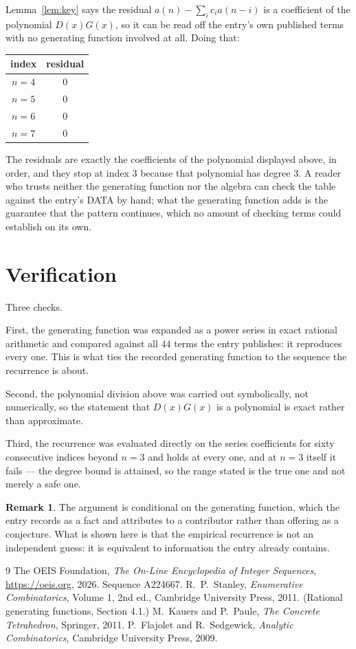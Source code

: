 \documentclass[11pt,a4paper]{article}
\theoremstyle{plain}
\theoremstyle{definition}
\newtheorem{remark}[theorem]{Remark}
\begin{document}
Lemma~\ref{lem:key} says the residual $a(n)-\sum_ic_ia(n-i)$ is a coefficient of the
polynomial $D(x)G(x)$, so it can be read off the entry's own published terms with no
generating function involved at all. Doing that:
\begin{center}
\begin{tabular}{cc}
index & residual \\ \hline
$n=4$ & $0$ \\
$n=5$ & $0$ \\
$n=6$ & $0$ \\
$n=7$ & $0$
\end{tabular}
\end{center}
The residuals are exactly the coefficients of the polynomial displayed above, in order, and
they stop at index $3$ because that polynomial has degree $3$. A reader who trusts
neither the generating function nor the algebra can check the table against the entry's DATA
by hand; what the generating function adds is the guarantee that the pattern continues, which
no amount of checking terms could establish on its own.

\section{Verification}

Three checks.

First, the generating function was expanded as a power series in exact rational arithmetic and
compared against all $44$ terms the entry publishes: it reproduces every one. This is
what ties the recorded generating function to the sequence the recurrence is about.

Second, the polynomial division above was carried out symbolically, not numerically, so the
statement that $D(x)G(x)$ is a polynomial is exact rather than approximate.

Third, the recurrence was evaluated directly on the series coefficients for sixty consecutive
indices beyond $n=3$ and holds at every one, and at $n=3$ itself it fails --- the
degree bound is attained, so the range stated is the true one and not merely a safe one.

\begin{remark}
The argument is conditional on the generating function, which the entry records as a fact and
attributes to a contributor rather than offering as a conjecture. What is shown here is that
the empirical recurrence is not an independent guess: it is equivalent to information the
entry already contains.
\end{remark}

\begin{thebibliography}{9}
 The OEIS Foundation, \emph{The On-Line Encyclopedia of Integer
Sequences}, \url{https://oeis.org}, 2026. Sequence A224667.
 R.~P.~Stanley, \emph{Enumerative Combinatorics}, Volume 1, 2nd ed.,
Cambridge University Press, 2011. (Rational generating functions, Section 4.1.)
 M.~Kauers and P.~Paule, \emph{The Concrete Tetrahedron}, Springer, 2011.
 P.~Flajolet and R.~Sedgewick, \emph{Analytic Combinatorics}, Cambridge
University Press, 2009.
\end{thebibliography}
\end{document}
